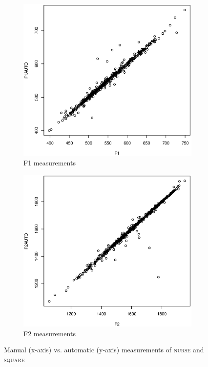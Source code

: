 		\begin{figure}[h]
			\centering
				\begin{subfigure}[b]{0.45\textwidth}
					\centering
					\includegraphics[width=\textwidth]{figures/F1F1AUTO}
					\caption{F1 measurements}
				\end{subfigure}
				\begin{subfigure}[b]{0.45\textwidth}
					\centering
					\includegraphics[width=\textwidth]{figures/F2F2AUTO}
					\caption{F2 measurements}
				\end{subfigure}
			\caption[Manual vs. automatic measurements (\textsc{nurse} and \textsc{square})]{Manual (x-axis) vs. automatic (y-axis) measurements of \textsc{nurse} and \textsc{square}}\label{fig.automatic.measurements}
		\end{figure}

